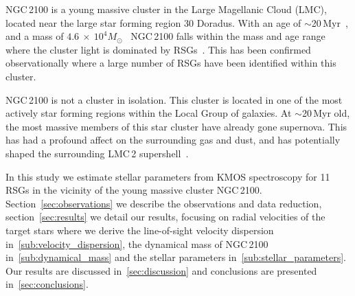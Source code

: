 \documentclass[useAMS,usenatbib]{mn2e}
\def\kms{$\mbox{km s}^{-1}$}
\begin{document}

NGC\,2100 is a young massive cluster in the Large Magellanic Cloud (LMC), located near the large star forming region 30 Doradus.
With an age of $\sim$20\,Myr~\citep{1991ApJS...76..185E,2015A&A...575A..62N}, and a mass of $4.6~\times~10^4M_{\odot}$~\citep[assuming~\cite{1966AJ.....71...64K} profiles]{2005ApJS..161..304M} NGC\,2100 falls within the mass and age range where the cluster light is dominated by RSGs~\citep{2013MNRAS.430L..35G}.
This has been confirmed observationally where a large number of RSGs have been identified within this cluster.

NGC\,2100 is not a cluster in isolation.
This cluster is located in one of the most actively star forming regions within the Local Group of galaxies.
At $\sim$20\,Myr old, the most massive members of this star cluster have already gone supernova.
This has had a profound affect on the surrounding gas and dust, and has potentially shaped the surrounding LMC\,2 supershell~\citep{1999ApJ...518..298P}.



In this study we estimate stellar parameters from KMOS spectroscopy for 11 RSGs in the vicinity of the young massive cluster NGC\,2100.
Section~\ref{sec:observations} we describe the observations and data reduction, section~\ref{sec:results} we detail our results, focusing on radial velocities of the target stars where we derive the line-of-sight velocity dispersion in~\ref{sub:velocity_dispersion}, the dynamical mass of NGC\,2100 in~\ref{sub:dynamical_mass} and the stellar parameters in~\ref{sub:stellar_parameters}.
Our results are discussed in~\ref{sec:discussion} and conclusions are presented in~\ref{sec:conclusions}.




\end{document}
